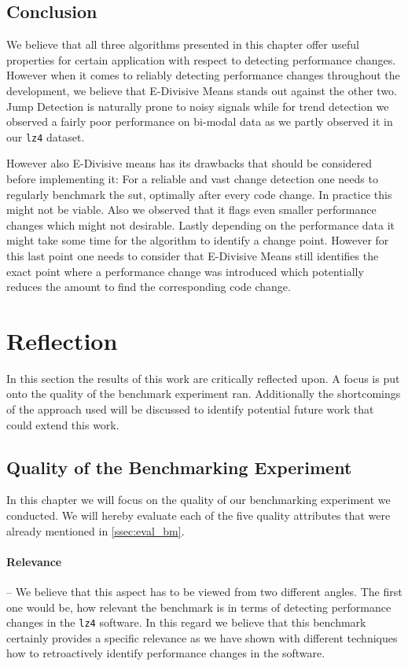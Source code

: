 \documentclass[	runningheads,
				a4paper]{llncs}
\begin{document}
\subsection{Conclusion}
We believe that all three algorithms presented in this chapter offer useful properties for certain application with respect to detecting performance changes. However when it comes to reliably detecting performance changes throughout the development, we believe that E-Divisive Means stands out against the other two. Jump Detection is naturally prone to noisy signals while for trend detection we observed a fairly poor performance on bi-modal data as we partly observed it in our \texttt{lz4} dataset.

However also E-Divisive means has its drawbacks that should be considered before implementing it: For a reliable and vast change detection one needs to regularly benchmark the \gls{sut}, optimally after every code change. In practice this might not be viable. Also we observed that it flags even smaller performance changes which might not desirable. Lastly depending on the performance data it might take some time for the algorithm to identify a change point. However for this last point one needs to consider that E-Divisive Means still identifies the exact point where a performance change was introduced which potentially reduces the amount to find the corresponding code change.

\section{Reflection}
In this section the results of this work are critically reflected upon. A focus is put onto the quality of the benchmark experiment ran. Additionally the shortcomings of the approach used will be discussed to identify potential future work that could extend this work.

	\subsection{Quality of the Benchmarking Experiment}
	\label{ssec:refl_quality}
	In this chapter we will focus on the quality of our benchmarking experiment we conducted. We will hereby evaluate each of the five quality attributes that were already mentioned in \autoref{ssec:eval_bm}.

	\paragraph{Relevance} -- We believe that this aspect has to be viewed from two different angles. The first one would be, how relevant the benchmark is in terms of detecting performance changes in the \texttt{lz4} software. In this regard we believe that this benchmark certainly provides a specific relevance as we have shown with different techniques how to retroactively identify performance changes in the software.
\end{document}
